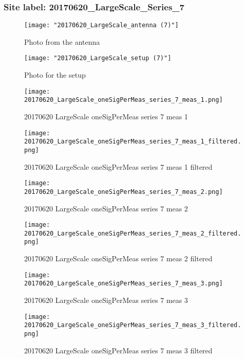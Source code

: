 \subsubsection{Site label: 20170620\_LargeScale\_Series\_7}
\begin{figure}[ht] \caption{Photo from the antenna}
\texttt{[image: "20170620\_LargeScale\_antenna (7)"]}\centering\end{figure}
\begin{figure}[ht] \caption{Photo for the setup}
\texttt{[image: "20170620\_LargeScale\_setup (7)"]}\centering\end{figure}
\begin{figure}[ht] \caption{20170620 LargeScale oneSigPerMeas series 7 meas 1}
\texttt{[image: 20170620\_LargeScale\_oneSigPerMeas\_series\_7\_meas\_1.png]}\centering\end{figure}
\begin{figure}[ht] \caption{20170620 LargeScale oneSigPerMeas series 7 meas 1 filtered}
\texttt{[image: 20170620\_LargeScale\_oneSigPerMeas\_series\_7\_meas\_1\_filtered.png]}\centering\end{figure}
\begin{figure}[ht] \caption{20170620 LargeScale oneSigPerMeas series 7 meas 2}
\texttt{[image: 20170620\_LargeScale\_oneSigPerMeas\_series\_7\_meas\_2.png]}\centering\end{figure}
\begin{figure}[ht] \caption{20170620 LargeScale oneSigPerMeas series 7 meas 2 filtered}
\texttt{[image: 20170620\_LargeScale\_oneSigPerMeas\_series\_7\_meas\_2\_filtered.png]}\centering\end{figure}
\begin{figure}[ht] \caption{20170620 LargeScale oneSigPerMeas series 7 meas 3}
\texttt{[image: 20170620\_LargeScale\_oneSigPerMeas\_series\_7\_meas\_3.png]}\centering\end{figure}
\begin{figure}[ht] \caption{20170620 LargeScale oneSigPerMeas series 7 meas 3 filtered}
\texttt{[image: 20170620\_LargeScale\_oneSigPerMeas\_series\_7\_meas\_3\_filtered.png]}\centering\end{figure}
\clearpage
